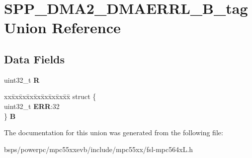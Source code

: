 \hypertarget{unionSPP__DMA2__DMAERRL__32B__tag}{}\section{S\+P\+P\+\_\+\+D\+M\+A2\+\_\+\+D\+M\+A\+E\+R\+R\+L\+\_\+B\+\_\+tag Union Reference}
\label{unionSPP__DMA2__DMAERRL__32B__tag}
\subsection*{Data Fields}
\begin{DoxyCompactItemize}
\item 
\mbox{\label{unionSPP__DMA2__DMAERRL__32B__tag_a2f58c893e5b8a91d9c7c47692cef7e08}} 
uint32\+\_\+t {\bfseries R}
\item 
\mbox{\label{unionSPP__DMA2__DMAERRL__32B__tag_a688ba5c28d293980a8d975ce4efe4234}} 
\begin{tabbing}
xx\=xx\=xx\=xx\=xx\=xx\=xx\=xx\=xx\=\kill
struct \{\\
\>uint32\_t {\bfseries ERR}:32\\
\} {\bfseries B}\\

\end{tabbing}\end{DoxyCompactItemize}


The documentation for this union was generated from the following file\+:\begin{DoxyCompactItemize}
\item 
bsps/powerpc/mpc55xxevb/include/mpc55xx/fsl-\/mpc564x\+L.\+h\end{DoxyCompactItemize}
